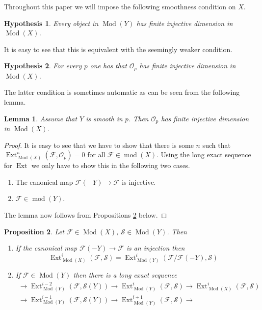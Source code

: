 \documentclass{amsproc}
\def\Fscr{{\mathcal F}}
\def\Oscr{{\mathcal O}}
\def\Sscr{{\mathcal S}}
\def\Ext{\operatorname {Ext}}
\def\coh{\operatorname {mod}}
\def\Qch{\operatorname {Mod}}
\def\r{\rightarrow}
\newtheorem{lemmas}{Lemma}[subsection]
\newtheorem{propositions}[lemmas]{Proposition}
\newtheorem{hypothesis}{Hypothesis}
\theoremstyle{definition}
\theoremstyle{remark}
\numberwithin{equation}{section}
\numberwithin{table}{section}
\numberwithin{figure}{section}
\begin{document}
Throughout this paper we will impose the following smoothness
  condition on $X$.
  {\def\thehypothesis{(*)}
\begin{hypothesis} Every object in $\Qch(Y)$ has finite injective
  dimension in $\Qch(X)$.
\end{hypothesis}
}
It is easy to see that this is equivalent with the seemingly weaker
condition.
  {\def\thehypothesis{(*')}
\begin{hypothesis} For every $p$ one has that $\Oscr_p$ has finite injective
  dimension in $\Qch(X)$.
\end{hypothesis}
}
The latter condition is sometimes automatic as can be seen from the
following lemma.
\begin{lemmas}
\label{ref:5.1.1a}
Assume that $Y$ is smooth in $p$. Then $\Oscr_p$ has finite injective
dimension in $\Qch(X)$.
\end{lemmas}
\begin{proof} It is easy to see that we have to show that there is some
$n$ such that $\Ext^n_{\Qch(X)}(\Fscr,\Oscr_p)=0$ for all $\Fscr\in\coh(X)$. Using
the long exact sequence for $\Ext$ we only have to show this in the
following two cases.
\begin{enumerate}
\item
The canonical map $\Fscr(-Y)\r \Fscr$ is injective.
\item $\Fscr\in\coh(Y)$.
\end{enumerate}
The lemma now follows from Propositions \ref{ref:5.1.2a} below.
\end{proof}
\begin{propositions} 
\label{ref:5.1.2a}
Let $\Fscr\in \Qch(X)$, $\Sscr\in \Qch(Y)$. Then
\begin{enumerate}
\item If the canonical map $\Fscr(-Y)\r \Fscr$ is an injection then
\[
\Ext^i_{\Qch(X)}(\Fscr,\Sscr) =\Ext^i_{\Qch(Y)}(\Fscr/\Fscr(-Y),\Sscr)
\]
\item If $\Fscr\in \Qch(Y)$ then there is a long exact sequence
\begin{multline*}
\r \Ext^{i-2}_{\Qch(Y)}(\Fscr,\Sscr(Y))
\r \Ext^i_{\Qch(Y)}(\Fscr,\Sscr)\r \Ext^i_{\Qch(X)}(\Fscr,\Sscr)
\\ \r \Ext^{i-1}_{\Qch(Y)}(\Fscr,\Sscr(Y))
\r 
\Ext^{i+1}_{\Qch(Y)}(\Fscr,\Sscr)\r
\end{multline*}
\end{enumerate}
\end{propositions}
\end{document}

